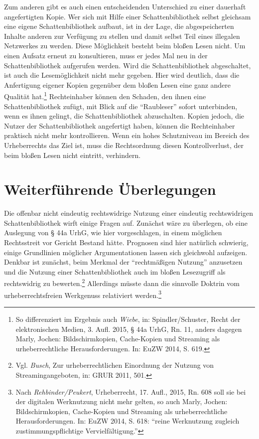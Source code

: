 \documentclass[a4paper,
fontsize=11pt,
oneside,
numbers=noperiodatend,
parskip=half-,
bibliography=totoc,
final
]{scrartcl}
\begin{document}
Zum anderen gibt es auch einen entscheidenden Unterschied zu einer
dauerhaft angefertigten Kopie. Wer sich mit Hilfe einer
Schattenbibliothek selbst gleichsam eine eigene Schattenbibliothek
aufbaut, ist in der Lage, die abgespeicherten Inhalte anderen zur
Verfügung zu stellen und damit selbst Teil eines illegalen Netzwerkes zu
werden. Diese Möglichkeit besteht beim bloßen Lesen nicht. Um einen
Aufsatz erneut zu konsultieren, muss er jedes Mal neu in der
Schattenbibliothek aufgerufen werden. Wird die Schattenbibliothek
abgeschaltet, ist auch die Lesemöglichkeit nicht mehr gegeben. Hier wird
deutlich, dass die Anfertigung eigener Kopien gegenüber dem bloßen Lesen
eine ganz andere Qualität hat.\footnote{So differenziert im Ergebnis
  auch \emph{Wiebe}, in: Spindler/Schuster, Recht der elektronischen
  Medien, 3. Aufl. 2015, § 44a UrhG, Rn. 11, anders dagegen Marly,
  Jochen: Bildschirmkopien, Cache-Kopien und Streaming als
  urheberrechtliche Herausforderungen. In: EuZW 2014, S. 619.}
Rechteinhaber können den Schaden, den ihnen eine Schattenbibliothek
zufügt, mit Blick auf die \enquote{Raubleser} sofort unterbinden, wenn
es ihnen gelingt, die Schattenbibliothek abzuschalten. Kopien jedoch,
die Nutzer der Schattenbibliothek angefertigt haben, können die
Rechteinhaber praktisch nicht mehr kontrollieren. Wenn ein hohes
Schutzniveau im Bereich des Urheberrechts das Ziel ist, muss die
Rechtsordnung diesen Kontrollverlust, der beim bloßen Lesen nicht
eintritt, verhindern.

\section{Weiterführende
Überlegungen}\label{weiterfuxfchrende-uxfcberlegungen}

Die offenbar nicht eindeutig rechtswidrige Nutzung einer eindeutig
rechtswidrigen Schattenbibliothek wirft einige Fragen auf. Zunächst wäre
zu überlegen, ob eine Auslegung von § 44a UrhG, wie hier vorgeschlagen,
in einem möglichen Rechtsstreit vor Gericht Bestand hätte. Prognosen
sind hier natürlich schwierig, einige Grundlinien möglicher
Argumentationen lassen sich gleichwohl aufzeigen. Denkbar ist zunächst,
beim Merkmal der \enquote{rechtmäßigen Nutzung} anzusetzen und die
Nutzung einer Schattenbibliothek auch im bloßen Lesezugriff als
rechtswidrig zu bewerten.\footnote{Vgl. \emph{Busch}, Zur
  urheberrechtlichen Einordnung der Nutzung von Streamingangeboten, in:
  GRUR 2011, 501.} Allerdings müsste dann die sinnvolle Doktrin vom
urheberrechtsfreien Werkgenuss relativiert werden.\footnote{Nach
  \emph{Rehbinder/Peukert}, Urheberrecht, 17. Aufl., 2015, Rn. 608 soll
  sie bei der digitalen Werk­nutzung nicht mehr gelten, so auch Marly,
  Jochen: Bildschirmkopien, Cache-Kopien und Streaming als
  urheberrechtliche Herausforderungen. In: EuZW 2014, S. 618:
  \enquote{reine Werknutzung zugleich zustimmungspflichtige
  Vervielfältigung.}}
\end{document}
